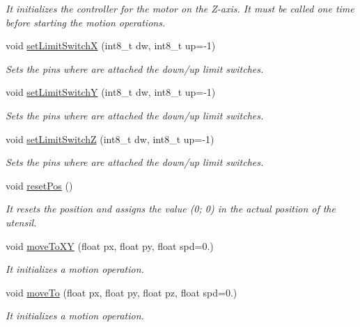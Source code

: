 \begin{DoxyCompactItemize}
\begin{DoxyCompactList}\small\item\em It initializes the controller for the motor on the Z-\/axis. It must be called one time before starting the motion operations. \end{DoxyCompactList}\item 
void \hyperlink{class_c_n_c___router_a0d1313b481b864a85758aaeab61e6595}{set\+Limit\+Switch\+X} (int8\+\_\+t dw, int8\+\_\+t up=-\/1)
\begin{DoxyCompactList}\small\item\em Sets the pins where are attached the down/up limit switches. \end{DoxyCompactList}\item 
void \hyperlink{class_c_n_c___router_af9308de7c3273a4f7dc18bc3cfe617d4}{set\+Limit\+Switch\+Y} (int8\+\_\+t dw, int8\+\_\+t up=-\/1)
\begin{DoxyCompactList}\small\item\em Sets the pins where are attached the down/up limit switches. \end{DoxyCompactList}\item 
void \hyperlink{class_c_n_c___router_ac993b5ad9929da6f83bb8783fafafa1a}{set\+Limit\+Switch\+Z} (int8\+\_\+t dw, int8\+\_\+t up=-\/1)
\begin{DoxyCompactList}\small\item\em Sets the pins where are attached the down/up limit switches. \end{DoxyCompactList}\item 
void \hyperlink{class_c_n_c___router_a30d838430b7452a8f47071d2f6b8845e}{reset\+Pos} ()
\begin{DoxyCompactList}\small\item\em It resets the position and assigns the value (0; 0) in the actual position of the utensil. \end{DoxyCompactList}\item 
void \hyperlink{class_c_n_c___router_a3aedfc767d93e8cb59f10322067ffdae}{move\+To\+X\+Y} (float px, float py, float spd=0.)
\begin{DoxyCompactList}\small\item\em It initializes a motion operation. \end{DoxyCompactList}\item 
void \hyperlink{class_c_n_c___router_a1b652407bb9e7bb170d55d1c96e6611c}{move\+To} (float px, float py, float pz, float spd=0.)
\begin{DoxyCompactList}\small\item\em It initializes a motion operation. \end{DoxyCompactList}\item 

\end{DoxyCompactItemize}
